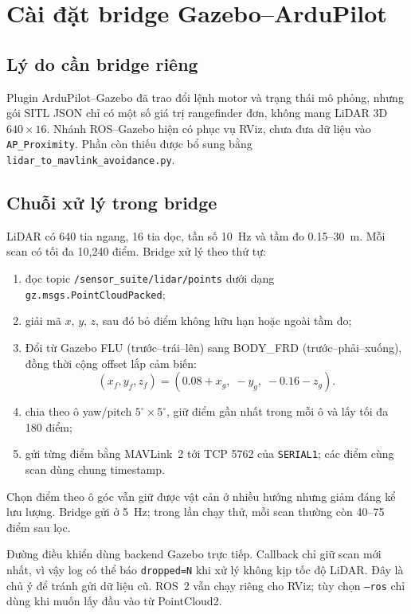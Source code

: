 \documentclass[11pt,a4paper]{article}
\begin{document}
\section{Cài đặt bridge Gazebo--ArduPilot}

\subsection{Lý do cần bridge riêng}

Plugin ArduPilot--Gazebo đã trao đổi lệnh motor và trạng thái mô phỏng, nhưng gói SITL JSON chỉ có một số giá trị rangefinder đơn, không mang LiDAR 3D $640\times16$. Nhánh ROS--Gazebo hiện có phục vụ RViz, chưa đưa dữ liệu vào \texttt{AP\_Proximity}. Phần còn thiếu được bổ sung bằng \texttt{lidar\_to\_mavlink\_avoidance.py}.

\subsection{Chuỗi xử lý trong bridge}

LiDAR có 640 tia ngang, 16 tia dọc, tần số 10~Hz và tầm đo 0.15--30~m. Mỗi scan có tối đa 10,240 điểm. Bridge xử lý theo thứ tự:

\begin{enumerate}
  \item đọc topic \texttt{/sensor\_suite/lidar/}\allowbreak\texttt{points} dưới dạng \texttt{gz.msgs.}\allowbreak\texttt{PointCloudPacked};
  \item giải mã $x$, $y$, $z$, sau đó bỏ điểm không hữu hạn hoặc ngoài tầm đo;
  \item Đổi từ Gazebo FLU (trước--trái--lên) sang BODY\_FRD (trước--phải--xuống), đồng thời cộng offset lắp cảm biến:
  \begin{equation}
    (x_f,y_f,z_f)=(0.08+x_g,\;-y_g,\;-0.16-z_g).
  \end{equation}
  \item chia theo ô yaw/pitch $5^{\circ}\times5^{\circ}$, giữ điểm gần nhất trong mỗi ô và lấy tối đa 180 điểm;
  \item gửi từng điểm bằng MAVLink~2 tới TCP 5762 của \texttt{SERIAL1}; các điểm cùng scan dùng chung timestamp.
\end{enumerate}

Chọn điểm theo ô góc vẫn giữ được vật cản ở nhiều hướng nhưng giảm đáng kể lưu lượng. Bridge gửi ở 5~Hz; trong lần chạy thử, mỗi scan thường còn 40--75 điểm sau lọc.

Đường điều khiển dùng backend Gazebo trực tiếp. Callback chỉ giữ scan mới nhất, vì vậy log có thể báo \texttt{dropped=N} khi xử lý không kịp tốc độ LiDAR. Đây là chủ ý để tránh gửi dữ liệu cũ. ROS~2 vẫn chạy riêng cho RViz; tùy chọn \texttt{--ros} chỉ dùng khi muốn lấy đầu vào từ PointCloud2.
\end{document}
